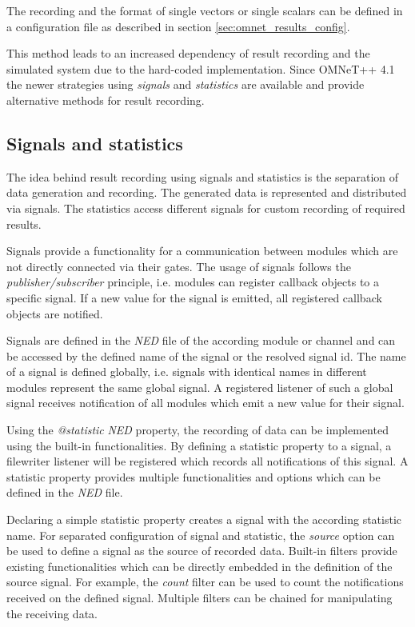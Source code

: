 The recording and the format of single vectors or single scalars can be defined in a configuration file as described in section \ref{sec:omnet_results_config}.

This method leads to an increased dependency of result recording and the simulated system due to the hard-coded implementation.
Since OMNeT++ 4.1 the newer strategies using \emph{signals} and \emph{statistics} are available and provide alternative methods for result recording.

\subsection{Signals and statistics}
\label{sec:omnet_results_signals}
The idea behind result recording using signals and statistics is the separation of data generation and recording.
The generated data is represented and distributed via signals.
The statistics access different signals for custom recording of required results. \cite[section 12.1.1]{omnet_manual}

Signals provide a functionality for a communication between modules which are not directly connected via their gates.
The usage of signals follows the \emph{publisher/subscriber} principle, i.e. modules can register callback objects to a specific signal.
If a new value for the signal is emitted, all registered callback objects are notified.

Signals are defined in the \emph{NED} file of the according module or channel and can be accessed by the defined name of the signal or the resolved signal id.
The name of a signal is defined globally, i.e. signals with identical names in different modules represent the same global signal.
A registered listener of such a global signal receives notification of all modules which emit a new value for their signal. \cite[section 4.14]{omnet_manual}

Using the \emph{@statistic} \emph{NED} property, the recording of data can be implemented using the built-in functionalities.
By defining a statistic property to a signal, a filewriter listener will be registered which records all notifications of this signal.
A statistic property provides multiple functionalities and options which can be defined in the \emph{NED} file.

Declaring a simple statistic property creates a signal with the according statistic name.
For separated configuration of signal and statistic, the \emph{source} option can be used to define a signal as the source of recorded data.
Built-in filters provide existing functionalities which can be directly embedded in the definition of the source signal.
For example, the \emph{count} filter can be used to count the notifications received on the defined signal.
Multiple filters can be chained for manipulating the receiving data.

